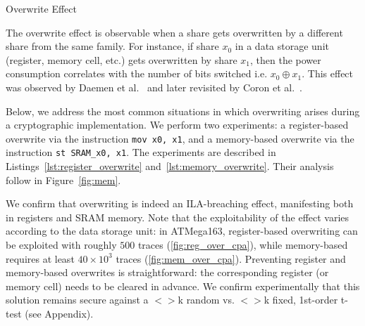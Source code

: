 \begin{subsection}{Overwrite Effect}\label{overwrite}

The overwrite effect is observable when a share gets overwritten by a different share from the same family. For instance, if share $x_0$ in a data storage unit (register, memory cell, etc.) gets overwritten by share $x_1$, then the power consumption correlates with the number of bits switched i.e. $x_0 \oplus x_1$. This effect was observed by Daemen et al.~\cite{noteonsca} and later revisited by Coron et al.~\cite{DBLP:conf/cosade/CoronGPRRV12}.

Below, we address the most common situations in which overwriting arises during a cryptographic implementation. We perform two experiments: a register-based overwrite via the instruction \texttt{mov x0, x1}, and a memory-based overwrite via the instruction \texttt{st SRAM\_x0,  x1}. 
The experiments are described in Listings~\ref{lst:register_overwrite} and~\ref{lst:memory_overwrite}.
Their analysis follow in Figure~\ref{fig:mem}.

We confirm that overwriting is indeed an ILA-breaching effect, manifesting both 
in registers and SRAM memory. Note that the exploitability of the effect varies 
according to the data storage unit: in ATMega163, register-based overwriting can 
be exploited with roughly $500$ traces (\ref{fig:reg_over_cpa}), while memory-based 
requires at least $40 \times 10^3$ traces (\ref{fig:mem_over_cpa}). 
Preventing register and memory-based overwrites is straightforward: the corresponding register (or memory cell) needs to be cleared in advance. We confirm experimentally that this solution remains secure against a $<>$k random vs. $<>$k fixed, 1st-order t-test (see Appendix).


\end{subsection}
